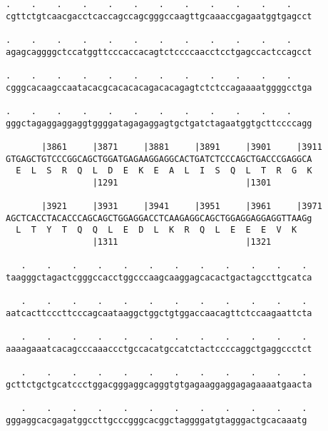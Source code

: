 \documentclass{article}
\begin{document}
\begin{Verbatim}
.    .    .    .    .    .    .    .    .    .    .    .    
cgttctgtcaacgacctcaccagccagcgggccaagttgcaaaccgagaatggtgagcct
                                                            
.    .    .    .    .    .    .    .    .    .    .    .    
agagcaggggctccatggttcccaccacagtctccccaacctcctgagccactccagcct
                                                            
.    .    .    .    .    .    .    .    .    .    .    .    
cgggcacaagccaatacacgcacacacagacacagagtctctccagaaaatggggcctga
                                                            
.    .    .    .    .    .    .    .    .    .    .    .    
gggctagaggaggaggtggggatagagaggagtgctgatctagaatggtgcttccccagg
                                                            
       |3861     |3871     |3881     |3891     |3901     |3911
GTGAGCTGTCCCGGCAGCTGGATGAGAAGGAGGCACTGATCTCCCAGCTGACCCGAGGCA
  E  L  S  R  Q  L  D  E  K  E  A  L  I  S  Q  L  T  R  G  K
                 |1291                         |1301        
  
       |3921     |3931     |3941     |3951     |3961     |3971
AGCTCACCTACACCCAGCAGCTGGAGGACCTCAAGAGGCAGCTGGAGGAGGAGGTTAAGg
  L  T  Y  T  Q  Q  L  E  D  L  K  R  Q  L  E  E  E  V  K   
                 |1311                         |1321        
  
   .    .    .    .    .    .    .    .    .    .    .    . 
taagggctagactcgggccacctggcccaagcaaggagcacactgactagccttgcatca
                                                            
   .    .    .    .    .    .    .    .    .    .    .    . 
aatcacttcccttcccagcaataaggctggctgtggaccaacagttctccaagaattcta
                                                            
   .    .    .    .    .    .    .    .    .    .    .    . 
aaaagaaatcacagcccaaaccctgccacatgccatctactccccaggctgaggccctct
                                                            
   .    .    .    .    .    .    .    .    .    .    .    . 
gcttctgctgcatccctggacgggaggcagggtgtgagaaggaggagagaaaatgaacta
                                                            
   .    .    .    .    .    .    .    .    .    .    .    .
gggaggcacgagatggccttgcccgggcacggctaggggatgtagggactgcacaaatg
                                                           
                                                           
 

\end{Verbatim}
\end{document}

